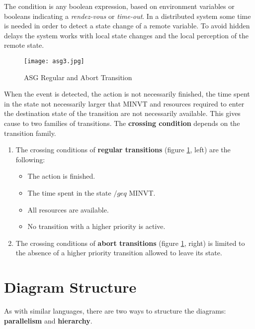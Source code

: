 \documentclass[../main.tex]{subfiles}
\begin{document}
The condition is any boolean expression, based on environment variables or booleans indicating a \textit{rendez-vous} or \textit{time-out}. In a distributed system some time is needed in order to detect a state change of a remote variable. To avoid hidden delays the system works with local state changes and the local perception of the remote state. 
\begin{figure}[H]
    \centering
    \texttt{[image: asg3.jpg]}
    \caption{ASG Regular and Abort Transition}
    \label{asg3}
\end{figure}
When the event is detected, the action is not necessarily finished, the time spent in the state not necessarily larger that MINVT and resources required to enter the destination state of the transition are not necessarily available. This gives cause to two families of transitions. The \textbf{crossing condition} depends on the transition family.
\begin{enumerate}
	\item  The crossing conditions of \textbf{regular transitions} (figure \ref{asg3}, left) are the following:
	\begin{itemize}
		\item The action is finished.
		\item The time spent in the state $/geq$ MINVT.
		\item All resources are available.
		\item No transition with a higher priority is active.
	\end{itemize}
	\item The crossing conditions of \textbf{abort transitions} (figure \ref{asg3}, right) is limited to the absence of a higher priority transition allowed to leave its state.
\end{enumerate}

\section{Diagram Structure}
As with similar languages, there are two ways to structure the diagrams: \textbf{parallelism} and \textbf{hierarchy}.
\end{document}
